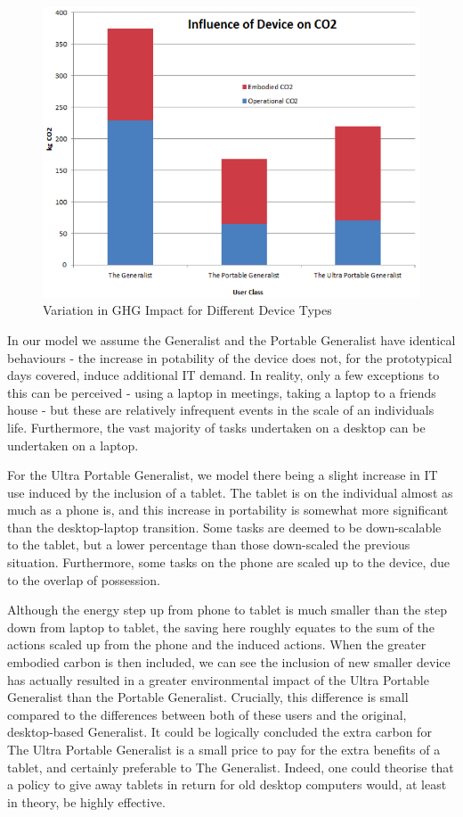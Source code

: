 \documentclass[conference]{IEEEtran}
\begin{document}
\begin{figure}[!ht]
\centering
\includegraphics[width=\columnwidth]{images/ghgimpact_devicetypes.png}
\caption{Variation in GHG Impact for Different Device Types}
\label{fig:ghgimpact_devicetype} 
\end{figure}

In our model we assume the Generalist and the Portable Generalist have
identical behaviours - the increase in potability of the device does
not, for the prototypical days covered, induce additional IT
demand. In reality, only a few exceptions to this can be perceived -
using a laptop in meetings, taking a laptop to a friends house - but
these are relatively infrequent events in the scale of an individuals
life. Furthermore, the vast majority of tasks undertaken on a desktop
can be undertaken on a laptop.

For the Ultra Portable Generalist, we model there being a slight
increase in IT use induced by the inclusion of a tablet. The tablet is
on the individual almost as much as a phone is, and this increase in
portability is somewhat more significant than the desktop-laptop
transition. Some tasks are deemed to be down-scalable to the tablet,
but a lower percentage than those down-scaled the previous
situation. Furthermore, some tasks on the phone are scaled up to the
device, due to the overlap of possession.

Although the energy step up from phone to tablet is much smaller than
the step down from laptop to tablet, the saving here roughly equates
to the sum of the actions scaled up from the phone and the induced
actions. When the greater embodied carbon is then included, we can see
the inclusion of new smaller device has actually resulted in a greater
environmental impact of the Ultra Portable Generalist than the
Portable Generalist.  Crucially, this difference is small compared to
the differences between both of these users and the original,
desktop-based Generalist. It could be logically concluded the extra
carbon for The Ultra Portable Generalist is a small price to pay for
the extra benefits of a tablet, and certainly preferable to The
Generalist. Indeed, one could theorise that a policy to give away
tablets in return for old desktop computers would, at least in theory,
be highly effective.
\end{document}
